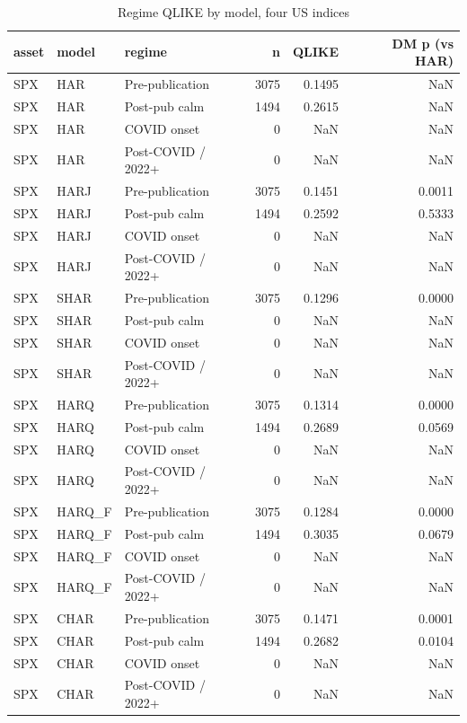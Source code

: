 \begin{table}
\caption{Regime QLIKE by model, four US indices}
\label{tab:table2_regime_qlike}
\begin{tabular}{lllrrr}
\toprule
asset & model & regime & n & QLIKE & DM p (vs HAR) \\
\midrule
SPX & HAR & Pre-publication & 3075 & 0.1495 & NaN \\
SPX & HAR & Post-pub calm & 1494 & 0.2615 & NaN \\
SPX & HAR & COVID onset & 0 & NaN & NaN \\
SPX & HAR & Post-COVID / 2022+ & 0 & NaN & NaN \\
SPX & HARJ & Pre-publication & 3075 & 0.1451 & 0.0011 \\
SPX & HARJ & Post-pub calm & 1494 & 0.2592 & 0.5333 \\
SPX & HARJ & COVID onset & 0 & NaN & NaN \\
SPX & HARJ & Post-COVID / 2022+ & 0 & NaN & NaN \\
SPX & SHAR & Pre-publication & 3075 & 0.1296 & 0.0000 \\
SPX & SHAR & Post-pub calm & 0 & NaN & NaN \\
SPX & SHAR & COVID onset & 0 & NaN & NaN \\
SPX & SHAR & Post-COVID / 2022+ & 0 & NaN & NaN \\
SPX & HARQ & Pre-publication & 3075 & 0.1314 & 0.0000 \\
SPX & HARQ & Post-pub calm & 1494 & 0.2689 & 0.0569 \\
SPX & HARQ & COVID onset & 0 & NaN & NaN \\
SPX & HARQ & Post-COVID / 2022+ & 0 & NaN & NaN \\
SPX & HARQ_F & Pre-publication & 3075 & 0.1284 & 0.0000 \\
SPX & HARQ_F & Post-pub calm & 1494 & 0.3035 & 0.0679 \\
SPX & HARQ_F & COVID onset & 0 & NaN & NaN \\
SPX & HARQ_F & Post-COVID / 2022+ & 0 & NaN & NaN \\
SPX & CHAR & Pre-publication & 3075 & 0.1471 & 0.0001 \\
SPX & CHAR & Post-pub calm & 1494 & 0.2682 & 0.0104 \\
SPX & CHAR & COVID onset & 0 & NaN & NaN \\
SPX & CHAR & Post-COVID / 2022+ & 0 & NaN & NaN \\
\bottomrule
\end{tabular}
\end{table}
